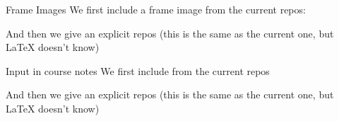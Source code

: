 \documentclass[mh,nontheorm,notes]{mikoslides}
\begin{document}
\begin{note}
\begin{omgroup}{Frame Images}
We first include a frame image from the current repos:


And then we give an explicit repos (this is the same as  the current one, but {\LaTeX}
doesn't know)

\end{omgroup}
\end{note}

\begin{omgroup}{Input in course notes}
We first include from the current repos


And then we give an explicit repos (this is the same as  the current one, but {\LaTeX}
doesn't know)

\end{omgroup}
\end{document}
